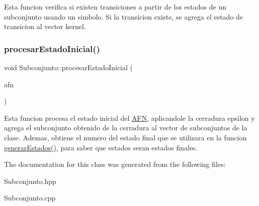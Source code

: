 Esta funcion verifica si existen transiciones a partir de los estados de un subconjunto usando un simbolo. Si la transicion existe, se agrega el estado de transicion al vector kernel. \mbox{\label{class_subconjunto_a3b5add3ea0f5d4b11b226ffe18cbcbb0}} 
\subsubsection{\texorpdfstring{procesar\+Estado\+Inicial()}{procesarEstadoInicial()}}
{\footnotesize\ttfamily void Subconjunto\+::procesar\+Estado\+Inicial (\begin{DoxyParamCaption}\item[{\hyperlink{class_a_f_n}{A\+FN}}]{afn }\end{DoxyParamCaption})}

Esta funcion procesa el estado inicial del \hyperlink{class_a_f_n}{A\+FN}, aplicandole la cerradura epsilon y agrega el subconjunto obtenido de la cerradura al vector de subconjuntos de la clase. Ademas, obtiene el numero del estado final que se utilizara en la funcion \hyperlink{class_subconjunto_aff47f0dcf2f97880af46f1bf55d94525}{generar\+Estados()}, para saber que estados seran estados finales. 

The documentation for this class was generated from the following files\+:\begin{DoxyCompactItemize}
\item 
Subconjunto.\+hpp\item 
Subconjunto.\+cpp\end{DoxyCompactItemize}

